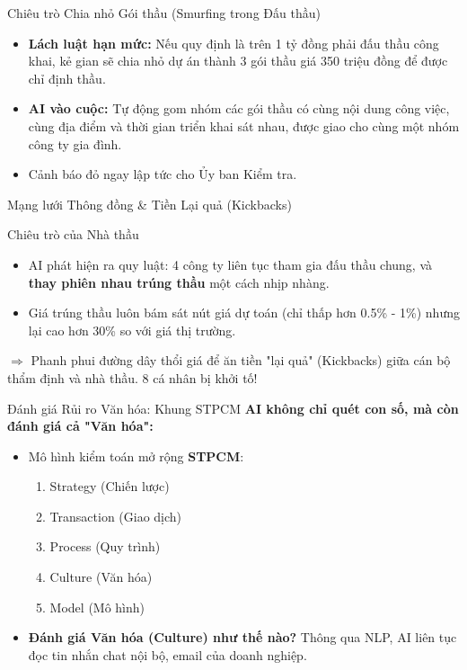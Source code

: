 \documentclass[aspectratio=169]{beamer}
\begin{document}
\begin{frame}{Chiêu trò Chia nhỏ Gói thầu (Smurfing trong Đấu thầu)}
    \begin{itemize}
        \item \textbf{Lách luật hạn mức:} Nếu quy định là trên 1 tỷ đồng phải đấu thầu công khai, kẻ gian sẽ chia nhỏ dự án thành 3 gói thầu giá 350 triệu đồng để được chỉ định thầu.
        \item \textbf{AI vào cuộc:} Tự động gom nhóm các gói thầu có cùng nội dung công việc, cùng địa điểm và thời gian triển khai sát nhau, được giao cho cùng một nhóm công ty gia đình.
        \item Cảnh báo đỏ ngay lập tức cho Ủy ban Kiểm tra.
    \end{itemize}
\end{frame}

\begin{frame}{Mạng lưới Thông đồng \& Tiền Lại quả (Kickbacks)}
    \begin{alertblock}{Chiêu trò của Nhà thầu}
        \begin{itemize}
            \item AI phát hiện ra quy luật: 4 công ty liên tục tham gia đấu thầu chung, và \textbf{thay phiên nhau trúng thầu} một cách nhịp nhàng.
            \item Giá trúng thầu luôn bám sát nút giá dự toán (chỉ thấp hơn 0.5\% - 1\%) nhưng lại cao hơn 30\% so với giá thị trường.
        \end{itemize}
    \end{alertblock}
    \vspace{0.2cm}
    $\Rightarrow$ Phanh phui đường dây thổi giá để ăn tiền "lại quả" (Kickbacks) giữa cán bộ thẩm định và nhà thầu. 8 cá nhân bị khởi tố!
\end{frame}

\begin{frame}{Đánh giá Rủi ro Văn hóa: Khung STPCM}
    \textbf{AI không chỉ quét con số, mà còn đánh giá cả "Văn hóa":}
    \begin{itemize}
        \item Mô hình kiểm toán mở rộng \textbf{STPCM}: 
            \begin{enumerate}
                \item Strategy (Chiến lược)
                \item Transaction (Giao dịch)
                \item Process (Quy trình)
                \item Culture (Văn hóa)
                \item Model (Mô hình)
            \end{enumerate}
        \item \textbf{Đánh giá Văn hóa (Culture) như thế nào?} Thông qua NLP, AI liên tục đọc tin nhắn chat nội bộ, email của doanh nghiệp.
    \end{itemize}
\end{frame}
\end{document}
